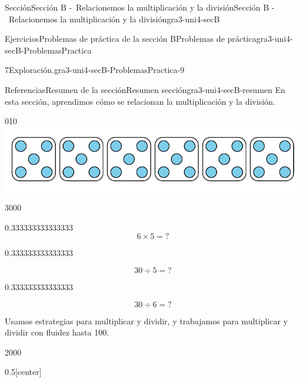 \documentclass[twoside,10pt,]{article}
\begin{document}
\begin{sectionptx}{Sección}{Sección B -~Relacionemos la multiplicación y la división}{}{Sección B -~Relacionemos la multiplicación y la división}{}{}{gra3-uni4-secB}
\begin{exercises-subsection}{Ejercicios}{Problemas de práctica de la sección B}{}{Problemas de práctica}{}{}{gra3-uni4-secB-ProblemasPractica}
\begin{divisionexercise}{7}{Exploración.}{}{gra3-uni4-secB-ProblemasPractica-9}
\begin{enumerate}[label={(\alph*)}]
\end{enumerate}
\end{divisionexercise}%
\end{exercises-subsection}
%
%
\typeout{************************************************}
\typeout{************************************************}
%
\begin{references-subsection}{Referencias}{Resumen de la sección}{}{Resumen sección}{}{}{gra3-uni4-secB-resumen}
En esta sección, aprendimos cómo se relacionan la multiplicación y la división.%
\begin{image}{0}{1}{0}{}%
\includegraphics[width=\linewidth]{external/svg-source/tikz-file-176322.pdf}
\end{image}%
\begin{sidebyside}{3}{0}{0}{0}%
\begin{sbspanel}{0.333333333333333}%
%
\begin{equation*}
6\times 5={?}
\end{equation*}
%
\end{sbspanel}%
\begin{sbspanel}{0.333333333333333}%
\par
%
\begin{equation*}
30\div 5={?}
\end{equation*}
%
\end{sbspanel}%
\begin{sbspanel}{0.333333333333333}%
\par
%
\begin{equation*}
30\div 6={?}
\end{equation*}
%
\end{sbspanel}%
\end{sidebyside}%
\par
Usamos estrategias para multiplicar y dividir, y trabajamos para multiplicar y dividir con fluidez hasta 100.%
\begin{sidebyside}{2}{0}{0}{0}%
\begin{sbspanel}{0.5}[center]%

\end{sbspanel}
\end{sidebyside}
\end{references-subsection}
\end{sectionptx}
\end{document}
